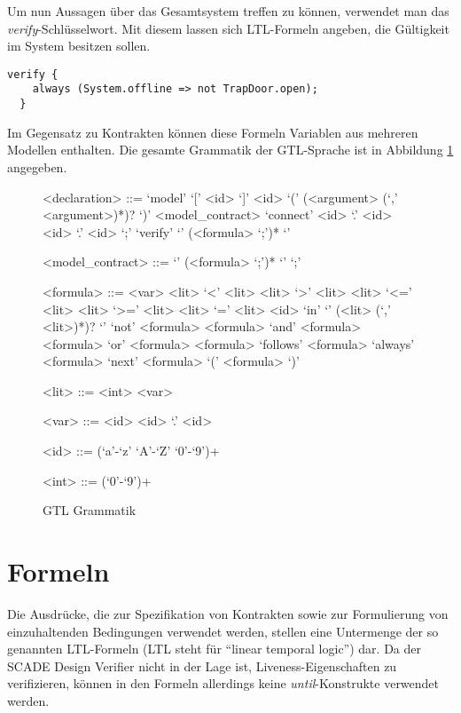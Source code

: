 Um nun Aussagen über das Gesamtsystem treffen zu können, verwendet man das \emph{verify}-Schlüsselwort.
Mit diesem lassen sich LTL-Formeln angeben, die Gültigkeit im System besitzen sollen.
\begin{lstlisting}[language=gtl]
  verify {
    always (System.offline => not TrapDoor.open);
  }
\end{lstlisting}
Im Gegensatz zu Kontrakten können diese Formeln Variablen aus mehreren Modellen enthalten.
Die gesamte Grammatik der GTL-Sprache ist in Abbildung \ref{fig:grammar} angegeben.

\begin{figure}
  \centering
  \begin{grammar}
    <declaration> ::= `model' `[' <id> `]' <id> `(' (<argument> (`,' <argument>)*)? `)' <model\_contract>
    \alt `connect' <id> `.' <id> <id> `.' <id> `;'
    \alt `verify' `{' (<formula> `;')* `}'
    
    <model\_contract> ::= `{' (<formula> `;')* `}'
    \alt `;'
    
    <formula> ::= <var>
    \alt <lit> `<' <lit>
    \alt <lit> `>' <lit>
    \alt <lit> `<=' <lit>
    \alt <lit> `>=' <lit>
    \alt <lit> `=' <lit>
    \alt <id> `in' `{' (<lit> (`,' <lit>)*)? `}'
    \alt `not' <formula>
    \alt <formula> `and' <formula>
    \alt <formula> `or' <formula>
    \alt <formula> `follows' <formula>
    \alt `always' <formula>
    \alt `next' <formula>
    \alt `(' <formula> `)'
    
    <lit> ::= <int>
    \alt <var>
    
    <var> ::= <id>
    \alt <id> `.' <id>

    <id> ::= (`a'-`z' `A'-`Z' `0'-`9')+
    
    <int> ::= (`0'-`9')+
  \end{grammar}
  \caption{GTL Grammatik}
  \label{fig:grammar}
\end{figure}

\section{Formeln}
Die Ausdrücke, die zur Spezifikation von Kontrakten sowie zur Formulierung von einzuhaltenden Bedingungen verwendet werden, stellen eine Untermenge der so genannten LTL-Formeln (LTL steht für "`linear temporal logic"') dar.
Da der SCADE Design Verifier nicht in der Lage ist, Liveness-Eigenschaften zu verifizieren, können in den Formeln allerdings keine \emph{until}-Konstrukte verwendet werden.

